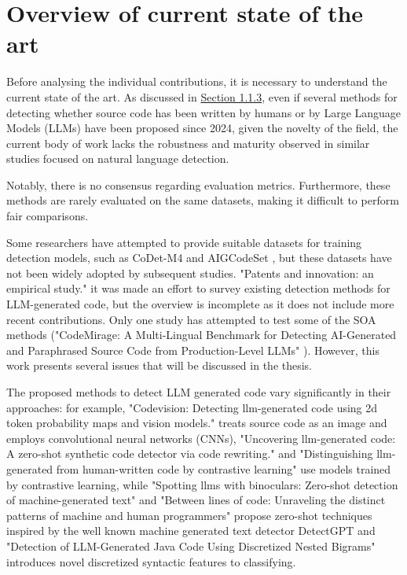 \clearpage

\chapter{Overview of current state of the art}

Before analysing the individual contributions, 
it is necessary to understand the current state 
of the art. As discussed in
\hyperref[sec:Challenges in LLM-Generated Code Detection]{Section 1.1.3}, 
even if several methods for detecting whether source code has been written 
by humans or by Large Language Models (LLMs) have been proposed since 2024, 
given the novelty of the field, the current body of work lacks the 
robustness and maturity observed in similar studies focused on natural 
language detection. 

Notably, there is no consensus regarding evaluation 
metrics. Furthermore, these methods are rarely evaluated on the same datasets, 
making it difficult to perform fair comparisons.

Some researchers have attempted to provide suitable datasets for training 
detection models, such as CoDet-M4 \cite{orel2025codet,} and 
AIGCodeSet \cite{demirok2024aigcodeset}, but 
these datasets have not been widely adopted by subsequent studies. 
"Patents and innovation: an empirical study." \cite{suh2024empirical} 
it was made an effort to survey existing detection methods for 
LLM-generated code, but the overview is incomplete as it does not include 
more recent contributions.
Only one study has attempted to test some of the SOA methods 
("CodeMirage: A Multi-Lingual Benchmark for Detecting AI-Generated and 
Paraphrased Source Code from Production-Level LLMs" \cite{guo2025codemirage}). 
However, this work presents several issues that 
will be discussed in the thesis.

The proposed methods to detect LLM generated code
vary significantly in their approaches: for example, 
"Codevision: Detecting llm-generated code using 2d token probability 
maps and vision models."\cite{xu2025codevision} treats 
source code as an image and employs convolutional neural networks (CNNs), 
"Uncovering llm-generated code: A zero-shot synthetic code detector via code rewriting."
\cite{ye2025uncovering} and 
"Distinguishing llm-generated from human-written code by contrastive learning" 
\cite{xu2025distinguishing} use models trained by contrastive learning, 
while "Spotting llms with binoculars: Zero-shot detection of machine-generated text" 
\cite{hans2024spotting}
and "Between lines of code: Unraveling the distinct patterns of machine and human programmers" 
\cite{shi2024between} propose zero-shot techniques inspired 
by the well known machine generated text detector DetectGPT\cite{mitchell2023detectgpt} 
and "Detection of LLM-Generated Java Code Using Discretized Nested Bigrams" \cite{paek2024detection}
introduces novel 
discretized syntactic features to classifying.

